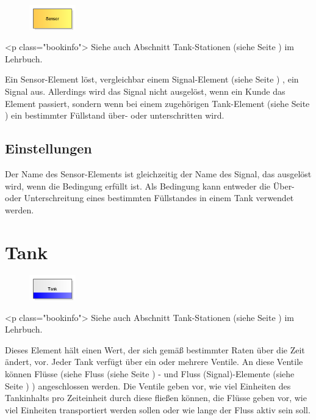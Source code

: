 \begin{figure}
\vspace{-22pt}
\includegraphics[width=2cm]{imageModelElementTankSensor.png}
\vspace{-22pt}
\end{figure}

<p class="bookinfo">
Siehe auch Abschnitt Tank-Stationen (siehe Seite \pageref{ref:book:8.8.2}) im Lehrbuch.

Ein Sensor-Element löst, vergleichbar einem Signal-Element (siehe Seite \pageref{ref:ModelElementSignal}) ,
ein Signal aus. Allerdings wird das Signal nicht ausgelöst, wenn ein Kunde das Element
passiert, sondern wenn bei einem zugehörigen Tank-Element (siehe Seite \pageref{ref:ModelElementTank}) 
ein bestimmter Füllstand über- oder unterschritten wird. 

\subsection*{Einstellungen}

Der Name des Sensor-Elements ist gleichzeitig der Name des Signal, das ausgelöst wird, wenn die Bedingung erfüllt ist.
Als Bedingung kann entweder die Über- oder Unterschreitung eines bestimmten Füllstandes in einem
Tank verwendet werden.


\section{Tank}
\label{ref:ModelElementTank}

\begin{figure}
\vspace{-22pt}
\includegraphics[width=2cm]{imageModelElementTank.png}
\vspace{-22pt}
\end{figure}

<p class="bookinfo">
Siehe auch Abschnitt Tank-Stationen (siehe Seite \pageref{ref:book:8.8.2}) im Lehrbuch.

Dieses Element hält einen Wert, der sich gemäß bestimmter Raten über die Zeit ändert, vor.
Jeder Tank verfügt über ein oder mehrere Ventile. An diese Ventile können Flüsse
(siehe Fluss (siehe Seite \pageref{ref:ModelElementTankFlowByClient}) - und
Fluss (Signal)-Elemente (siehe Seite \pageref{ref:ModelElementTankFlowBySignal}) ) angeschlossen werden.
Die Ventile geben vor, wie viel Einheiten des Tankinhalts pro Zeiteinheit durch diese
fließen können, die Flüsse geben vor, wie viel Einheiten transportiert werden sollen oder
wie lange der Fluss aktiv sein soll.

